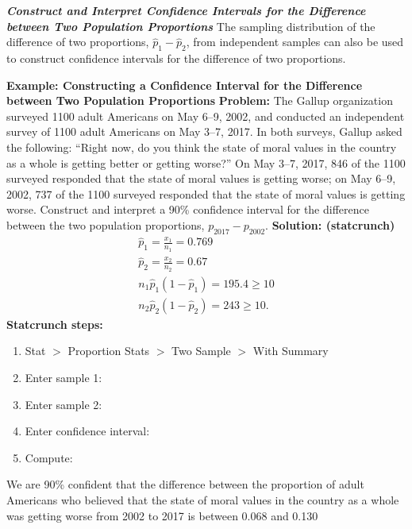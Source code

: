 \documentclass{report}
\begin{document}
    \pagebreak \bigbreak \noindent 
    \textbf{\textit{Construct and Interpret Confidence Intervals for the Difference between Two Population Proportions}}
    \bigbreak \noindent 
    The sampling distribution of the difference of two proportions, $\hat{p}_1 - \hat{p}_2$, from independent samples can also be used to construct confidence intervals for the difference of two proportions.
    \bigbreak \noindent 
    \begin{mdframed}
      \textbf{Example: Constructing a Confidence Interval for the Difference between Two Population Proportions}
      \bigbreak \noindent 
      \textbf{Problem:}
      The Gallup organization surveyed 1100 adult Americans on May 6–9, 2002, and conducted an independent survey of 1100 adult Americans on May 3–7, 2017. In both surveys, Gallup asked the following: “Right now, do you think the state of moral values in the country as a whole is getting better or getting worse?” On May 3–7, 2017, 846 of the 1100 surveyed responded that the state of moral values is getting worse; on May 6–9, 2002, 737 of the 1100 surveyed responded that the state of moral values is getting worse. Construct and interpret a 90\% confidence interval for the difference between the two population proportions, \(p_{2017} - p_{2002}\).
      \bigbreak \noindent 
      \textbf{Solution: (statcrunch)}
      \begin{align*}
          \hat{p}_{1} = \frac{x_{1}}{n_{1}} = 0.769 \\
          \hat{p}_{2} = \frac{x_{2}}{n_{2}} = 0.67 \\
          n_{1}\hat{p}_{1}(1-\hat{p}_{1}) = 195.4 \geq 10 \\
          n_{2}\hat{p}_{2}(1-\hat{p}_{2}) = 243 \geq 10
      .\end{align*}
      \textbf{Statcrunch steps:}
      \begin{enumerate}
          \item Stat $> $ Proportion Stats $> $ Two Sample $> $ With Summary
         \item Enter sample 1:
         \item Enter sample 2:
        \item Enter confidence interval:
        \item Compute:
      \end{enumerate}
      We are 90\% confident that the difference between the proportion of adult Americans who believed that the state of moral values in the country as a whole was getting worse from 2002 to 2017 is between 0.068 and 0.130
      
    \end{mdframed}
    \pagebreak 
\end{document}
